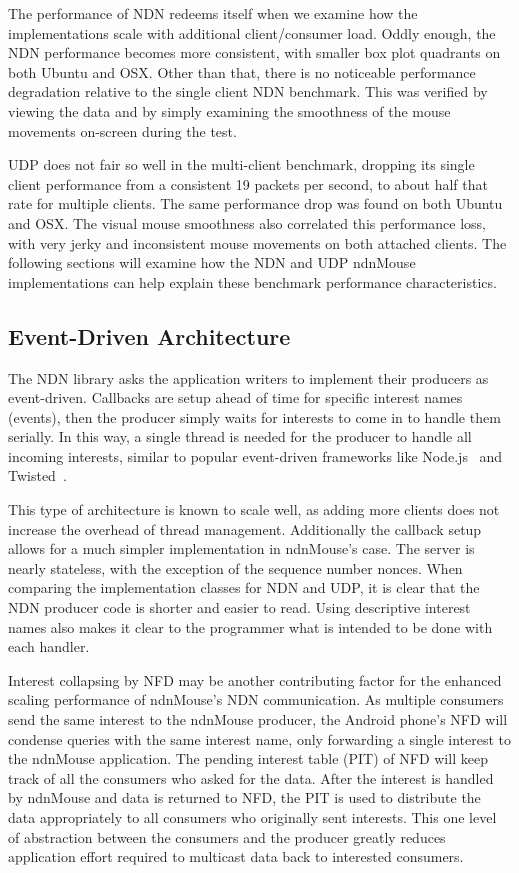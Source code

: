 \documentclass{sig-alternate}
\renewcommand\_{\textunderscore\allowbreak}  %
\begin{document}
The performance of NDN redeems itself when we examine how the implementations scale with additional client/consumer load. Oddly enough, the NDN performance becomes more consistent, with smaller box plot quadrants on both Ubuntu and OSX. Other than that, there is no noticeable performance degradation relative to the single client NDN benchmark. This was verified by viewing the data and by simply examining the smoothness of the mouse movements on-screen during the test.

UDP does not fair so well in the multi-client benchmark, dropping its single client performance from a consistent 19 packets per second, to about half that rate for multiple clients. The same performance drop was found on both Ubuntu and OSX. The visual mouse smoothness also correlated this performance loss, with very jerky and inconsistent mouse movements on both attached clients. The following sections will examine how the NDN and UDP ndnMouse implementations can help explain these benchmark performance characteristics.

\subsection{Event-Driven Architecture}
The NDN library asks the application writers to implement their producers as event-driven. Callbacks are setup ahead of time for specific interest names (events), then the producer simply waits for interests to come in to handle them serially. In this way, a single thread is needed for the producer to handle all incoming interests, similar to popular event-driven frameworks like Node.js~\cite{nodejs} and Twisted~\cite{twisted}. 

This type of architecture is known to scale well, as adding more clients does not increase the overhead of thread management. Additionally the callback setup allows for a much simpler implementation in ndnMouse's case. The server is nearly stateless, with the exception of the sequence number nonces. When comparing the implementation classes for NDN and UDP, it is clear that the NDN producer code is shorter and easier to read. Using descriptive interest names also makes it clear to the programmer what is intended to be done with each handler.

Interest collapsing by NFD may be another contributing factor for the enhanced scaling performance of ndnMouse's NDN communication. As multiple consumers send the same interest to the ndnMouse producer, the Android phone's NFD will condense queries with the same interest name, only forwarding a single interest to the ndnMouse application. The pending interest table (PIT) of NFD will keep track of all the consumers who asked for the data. After the interest is handled by ndnMouse and data is returned to NFD, the PIT is used to distribute the data appropriately to all consumers who originally sent interests. This one level of abstraction between the consumers and the producer greatly reduces application effort required to multicast data back to interested consumers. 
\end{document}
